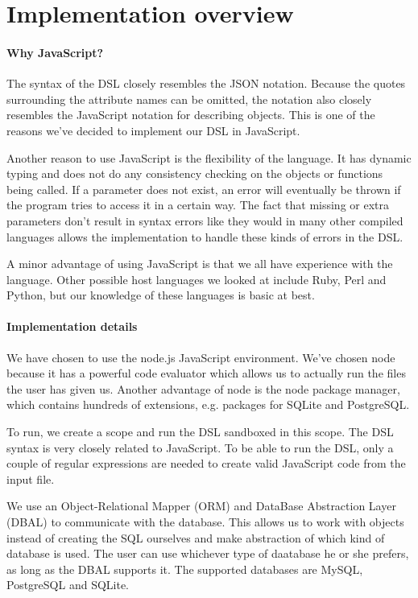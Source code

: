 \documentclass[a4paper,11pt]{article}
\begin{document}
\clearpage
\section{Implementation overview}

\paragraph*{Why JavaScript?} The syntax of the DSL closely resembles the JSON notation. Because the quotes surrounding the attribute names can be omitted, the notation also closely resembles the JavaScript notation for describing objects. This is one of the reasons we've decided to implement our DSL in JavaScript.
\par Another reason to use JavaScript is the flexibility of the language. It has dynamic typing and does not do any consistency checking on the objects or functions being called. If a parameter does not exist, an error will eventually be thrown if the program tries to access it in a certain way. The fact that missing or extra parameters don't result in syntax errors like they would in many other compiled languages allows the implementation to handle these kinds of errors in the DSL.
\par A minor advantage of using JavaScript is that we all have experience with the language. Other possible host languages we looked at include Ruby, Perl and Python, but our knowledge of these languages is basic at best.

\paragraph*{Implementation details} We have chosen to use the node.js JavaScript environment. We've chosen node because it has a powerful code evaluator which allows us to actually run the files the user has given us. Another advantage of node is the node package manager, which contains hundreds of extensions, e.g. packages for SQLite and PostgreSQL.
\par To run, we create a scope and run the DSL sandboxed in this scope. The DSL syntax is very closely related to JavaScript. To be able to run the DSL, only a couple of regular expressions are needed to create valid JavaScript code from the input file.
\par We use an Object-Relational Mapper (ORM) and DataBase Abstraction Layer (DBAL) to communicate with the database. This allows us to work with objects instead of creating the SQL ourselves and make abstraction of which kind of database is used. The user can use whichever type of daatabase he or she prefers, as long as the DBAL supports it. The supported databases are MySQL, PostgreSQL and SQLite.
\end{document}
